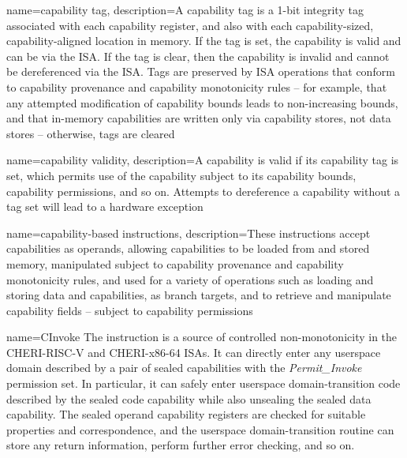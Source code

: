 {
  name=capability tag,
  description={A capability tag is a 1-bit integrity tag associated with each
    \gls{capability register}, and also with each capability-sized,
    capability-aligned location in memory.
    If the tag is set, the \gls{capability} is valid and can be
     via the ISA.
    If the tag is clear, then the capability is invalid and cannot be
    dereferenced via the ISA.
    Tags are preserved
by ISA
operations that conform to \gls{capability
    provenance} and \gls{capability monotonicity} rules -- for example,
    that any attempted modification of \gls{capability bounds} leads to
    non-increasing bounds,
 and that in-memory capabilities are written only
    via capability stores, not data stores -- otherwise, tags are cleared}
%
}

{
  name=capability validity,
  description={A \gls{capability} is valid if its \gls{capability tag}
    is set, which permits use of the capability subject to its
    \gls{capability bounds}, \gls{capability permissions}, and so on.
    Attempts to \gls{dereference} a capability without a tag set will lead
    to a hardware exception}
}

{
  name=capability-based instructions,
  description={These instructions accept capabilities as operands, allowing
    capabilities to be loaded from and stored memory, manipulated subject to
    \gls{capability provenance} and \gls{capability monotonicity} rules,
    and used for a variety of operations such as loading and storing data and
    capabilities, as branch targets, and to retrieve and manipulate capability
    fields -- subject to \gls{capability permissions}}
}

{
  name=CInvoke
}
{
  The  instruction is a source of controlled
  non-monotonicity in the \gls{CHERI-RISC-V} and \gls{CHERI-x86-64} ISAs.
  It can directly enter any userspace domain described by a pair
  of sealed capabilities with the \emph{Permit\_Invoke} permission set.
  In particular, it can
  safely enter userspace domain-transition code
  described by the sealed \gls{code capability} while also unsealing
  the sealed \gls{data capability}.
  The sealed operand \glspl{capability register}
  are checked for suitable properties and correspondence, and the userspace
  domain-transition routine can store any return information, perform further error
  checking, and so on.
}

